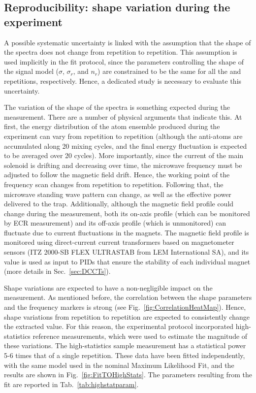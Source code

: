 
\subsection{Reproducibility: shape variation during the experiment} \label{sec:Reproducibility}

A possible systematic uncertainty is linked with the assumption that the shape of the spectra does not change from repetition to repetition. This assumption is used implicitly in the fit protocol, since the parameters controlling the shape of the signal model ($\sigma$, $\sigma_{r}$, and $n_{r}$) are constrained to be the same for all the \cb and \da repetitions, respectively. Hence, a dedicated study is necessary to evaluate this uncertainty.

The variation of the shape of the spectra is something expected during the measurement. There are a number of physical arguments that indicate this. At first, the energy distribution of the atom ensemble produced during the experiment can vary from repetition to repetition (although the anti-atoms are accumulated along 20 mixing cycles, and the final energy fluctuation is expected to be averaged over 20 cycles). More importantly, since the current of the main solenoid is drifting and decreasing over time, the microwave frequency must be adjusted to follow the magnetic field drift. Hence, the working point of the frequency scan changes from repetition to repetition. Following that, the microwave standing wave pattern can change, as well as the effective power delivered to the trap. Additionally, although the magnetic field profile could change during the measurement, both its on-axis profile (which can be monitored by ECR measurement) and its off-axis profile (which is unmonitored) can fluctuate due to current fluctuations in the magnets. The magnetic field profile is monitored using direct-current current transformers based on magnetometer sensors (ITZ 2000-SB FLEX ULTRASTAB from LEM International SA), and its value is used as input to PIDs that ensure the stability of each individual magnet (more details in Sec.~\ref{sec:DCCTs}).

Shape variations are expected to have a non-negligible impact on the measurement. As mentioned before, the correlation between the shape parameters and the frequency markers is strong (see Fig.~\ref{fig:CorrelationHeatMap}). Hence, shape variations from repetition to repetition are expected to consistently change the extracted value. For this reason, the experimental protocol incorporated high-statistics reference measurements, which were used to estimate the magnitude of these variations. The high-statistics sample measurement has a statistical power 5-6 times that of a single repetition. These data have been fitted independently, with the same model used in the nominal Maximum Likelihood Fit, and the results are shown in Fig.~\ref{fig:FitTOHighStats}. The parameters resulting from the fit are reported in Tab.~\ref{tab:highstatparam}.



